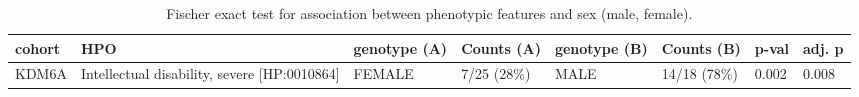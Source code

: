 \begin{fontsize}
\begin{table}
\centering
\begin{tabular}{l>{\raggedright}p{2.5cm}llllll}
\toprule
\textbf{cohort} & \textbf{HPO} & \textbf{genotype (A)} & \textbf{Counts (A)} & \textbf{genotype (B)} & \textbf{Counts (B)} & \textbf{p-val} & \textbf{adj. p}\\
\midrule
KDM6A & Intellectual disability, severe [HP:0010864] & FEMALE & 7/25 (28\%) & MALE & 14/18 (78\%) & 0.002 & 0.008\\
\bottomrule
\end{tabular}
\caption{Fischer exact test for association between phenotypic features and sex (male, female).}
\label{tab:to_do}
\end{table}
\end{fontsize}